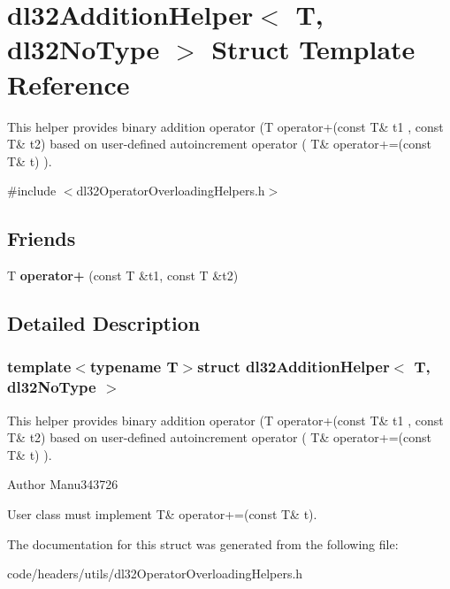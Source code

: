 \hypertarget{structdl32_addition_helper_3_01_t_00_01dl32_no_type_01_4}{\section{dl32\-Addition\-Helper$<$ T, dl32\-No\-Type $>$ Struct Template Reference}
\label{structdl32_addition_helper_3_01_t_00_01dl32_no_type_01_4}
}


This helper provides binary addition operator (T operator+(const T\& t1 , const T\& t2) based on user-\/defined autoincrement operator ( T\& operator+=(const T\& t) ).  




{\ttfamily \#include $<$dl32\-Operator\-Overloading\-Helpers.\-h$>$}

\subsection*{Friends}
\begin{DoxyCompactItemize}
\item 
\hypertarget{structdl32_addition_helper_3_01_t_00_01dl32_no_type_01_4_a6cbb5c55c311ba879df1f89905de2b8d}{T {\bfseries operator+} (const T \&t1, const T \&t2)}\label{structdl32_addition_helper_3_01_t_00_01dl32_no_type_01_4_a6cbb5c55c311ba879df1f89905de2b8d}

\end{DoxyCompactItemize}


\subsection{Detailed Description}
\subsubsection*{template$<$typename T$>$struct dl32\-Addition\-Helper$<$ T, dl32\-No\-Type $>$}

This helper provides binary addition operator (T operator+(const T\& t1 , const T\& t2) based on user-\/defined autoincrement operator ( T\& operator+=(const T\& t) ). 

\begin{DoxyAuthor}{Author}
Manu343726
\end{DoxyAuthor}
User class must implement T\& operator+=(const T\& t). 

The documentation for this struct was generated from the following file\-:\begin{DoxyCompactItemize}
\item 
code/headers/utils/dl32\-Operator\-Overloading\-Helpers.\-h\end{DoxyCompactItemize}
